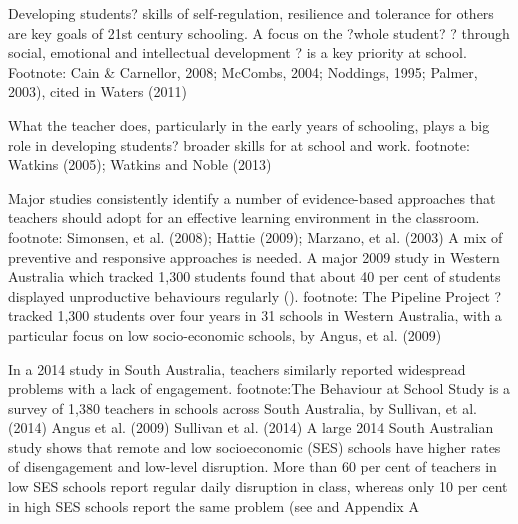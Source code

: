 Developing students? skills of self-regulation, resilience and tolerance for others are key goals of 21st century schooling. A focus on the ?whole student? ? through social, emotional and intellectual development ? is a key priority at school. Footnote: Cain & Carnellor, 2008; McCombs, 2004; Noddings, 1995; Palmer, 2003), cited in Waters (2011)

What the teacher does, particularly in the early years of schooling, plays a big role in developing students? broader skills for at school and work. footnote: Watkins (2005); Watkins and Noble (2013)

Major studies consistently identify a number of evidence-based approaches that teachers should adopt for an effective learning environment in the classroom. footnote: Simonsen, et al. (2008); Hattie (2009); Marzano, et al. (2003)
A mix of preventive and responsive approaches is needed.  %
A major 2009 study in Western Australia which tracked 1,300 students found that about 40 per cent of students displayed unproductive behaviours regularly (). footnote: The Pipeline Project ? tracked 1,300 students over four years in 31 schools in Western Australia, with a particular focus on low socio-economic schools, by Angus, et al. (2009)

In a 2014 study in South Australia, teachers similarly reported widespread problems with a lack of engagement. footnote:The Behaviour at School Study is a survey of 1,380 teachers in schools across South Australia, by Sullivan, et al. (2014)
%
{Angus et al. (2009)}
%
{Sullivan et al. (2014)}
A large 2014 South Australian study shows that remote and low socioeconomic (SES) schools have higher rates of disengagement and low-level disruption. More than 60 per cent of teachers in low SES schools report regular daily disruption in class, whereas only 10 per cent in high SES schools report the same problem (see  and Appendix A %


